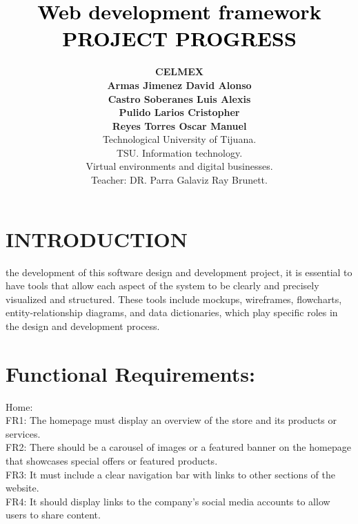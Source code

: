 \documentclass[journal]{IEEEtran}
\begin{document}
\title{\vspace{0.5cm}\textcolor{black}{Web development framework\\ PROJECT PROGRESS\\\vspace{0.25cm}}}
\author{
   \textbf{CELMEX}\\
    \textbf{Armas Jimenez David Alonso}\\
    \textbf{Castro Soberanes Luis Alexis}\\
    \textbf{Pulido Larios Cristopher}\\
    \textbf{Reyes Torres Oscar Manuel}\\
    \vspace{0.5cm}
    Technological University of Tijuana.\\ 
    TSU. Information technology.\\ 
    Virtual environments and digital businesses.\\ 
    Teacher: DR. Parra Galaviz Ray Brunett.
}


\maketitle\thispagestyle{fancy}
\IEEEpeerreviewmaketitle

\section{INTRODUCTION}

  the development of this software design and development project, it is essential to have tools that allow each aspect of the system to be clearly and precisely visualized and structured. These tools include mockups, wireframes, flowcharts, entity-relationship diagrams, and data dictionaries, which play specific roles in the design and development process.

\section{Functional Requirements:}
Home: \\
FR1: The homepage must display an overview of the store and its products or services. \\
FR2: There should be a carousel of images or a featured banner on the homepage that showcases special offers or featured products. \\
FR3: It must include a clear navigation bar with links to other sections of the website. \\
FR4: It should display links to the company's social media accounts to allow users to share content. \\
\end{document}
